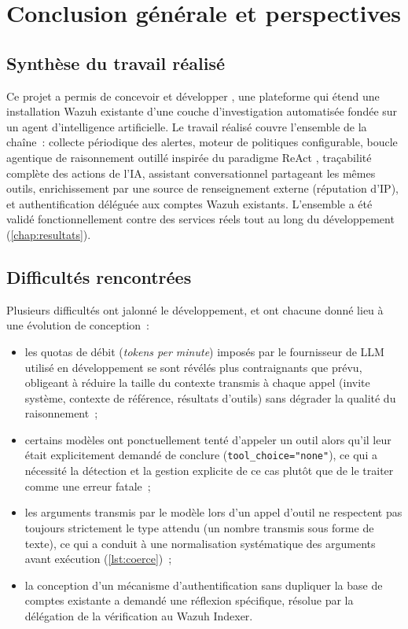 \chapter{Conclusion générale et perspectives}
\label{chap:conclusion}

\section{Synthèse du travail réalisé}

Ce projet a permis de concevoir et développer \projectname, une plateforme
qui étend une installation Wazuh existante d'une couche d'investigation
automatisée fondée sur un agent d'intelligence artificielle. Le travail
réalisé couvre l'ensemble de la chaîne~: collecte périodique des alertes,
moteur de politiques configurable, boucle agentique de raisonnement outillé
inspirée du paradigme ReAct \cite{react2022}, traçabilité complète des
actions de l'IA, assistant conversationnel partageant les mêmes outils,
enrichissement par une source de renseignement externe (réputation d'IP),
et authentification déléguée aux comptes Wazuh existants. L'ensemble a été
validé fonctionnellement contre des services réels tout au long du
développement (\cref{chap:resultats}).

\section{Difficultés rencontrées}

Plusieurs difficultés ont jalonné le développement, et ont chacune donné
lieu à une évolution de conception~:

\begin{itemize}
  \item les quotas de débit (\textit{tokens per minute}) imposés par le
        fournisseur de LLM utilisé en développement se sont révélés plus
        contraignants que prévu, obligeant à réduire la taille du contexte
        transmis à chaque appel (invite système, contexte de référence,
        résultats d'outils) sans dégrader la qualité du raisonnement~;
  \item certains modèles ont ponctuellement tenté d'appeler un outil alors
        qu'il leur était explicitement demandé de conclure
        (\texttt{tool\_choice="none"}), ce qui a nécessité la détection et
        la gestion explicite de ce cas plutôt que de le traiter comme une
        erreur fatale~;
  \item les arguments transmis par le modèle lors d'un appel d'outil ne
        respectent pas toujours strictement le type attendu (un nombre
        transmis sous forme de texte), ce qui a conduit à une normalisation
        systématique des arguments avant exécution (\cref{lst:coerce})~;
  \item la conception d'un mécanisme d'authentification sans dupliquer la
        base de comptes existante a demandé une réflexion spécifique,
        résolue par la délégation de la vérification au Wazuh Indexer.
\end{itemize}

